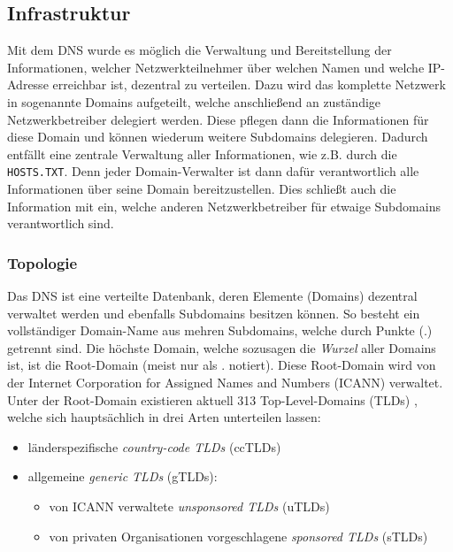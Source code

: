 \documentclass[a4paper, 12pt, BCOR10mm, DIV12, toc=bibliography, toc=listof, german]{scrbook}
\begin{document}

			\subsection{Infrastruktur} %
			\label{sub:infrastruktur}


			Mit dem DNS wurde es möglich die Verwaltung und Bereitstellung der Informationen, welcher
			Netzwerkteilnehmer über welchen Namen und welche IP-Adresse erreichbar ist, dezentral zu
			verteilen. Dazu wird das komplette Netzwerk in sogenannte Domains aufgeteilt, welche
			anschließend an zuständige Netzwerkbetreiber delegiert werden. Diese pflegen dann die
			Informationen für diese Domain und können wiederum weitere Subdomains delegieren. Dadurch
			entfällt eine zentrale Verwaltung  aller Informationen, wie z.B. durch die \texttt{HOSTS.TXT}.
			Denn jeder Domain-Verwalter ist dann dafür verantwortlich alle Informationen über seine Domain
			bereitzustellen. Dies schließt auch die Information mit ein, welche anderen Netzwerkbetreiber
			für etwaige Subdomains verantwortlich sind.

				\subsubsection*{Topologie} %
				
				Das DNS ist eine verteilte Datenbank, deren Elemente (Domains) dezentral  verwaltet werden
				und ebenfalls Subdomains besitzen können. So besteht ein vollständiger Domain-Name aus
				mehren Subdomains, welche durch Punkte (.) getrennt sind. Die höchste Domain, welche
				sozusagen die \textit{Wurzel} aller Domains ist, ist die Root-Domain (meist nur als
				\glqq{}.\grqq{} notiert).
				Diese Root-Domain wird von der Internet Corporation for Assigned Names and Numbers (ICANN)
				verwaltet. Unter der Root-Domain existieren aktuell 313
				Top-Level-Domains (TLDs) \cite{tlds}, welche sich hauptsächlich in drei Arten unterteilen lassen:

					\begin{itemize}
						\item länderspezifische \textit{country-code TLDs} (ccTLDs)
						\item allgemeine \textit{generic TLDs} (gTLDs):
						\begin{itemize}
							\item von ICANN verwaltete \textit{unsponsored TLDs} (uTLDs)
							\item von privaten Organisationen vorgeschlagene \textit{sponsored TLDs}
								(sTLDs)
						\end{itemize}
					\end{itemize}
					
\end{document}
